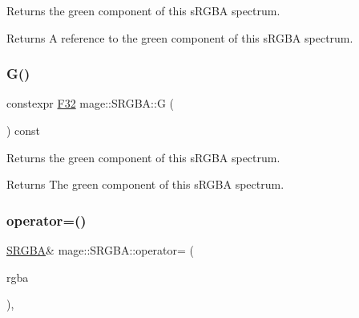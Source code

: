 Returns the green component of this s\+R\+G\+BA spectrum.

\begin{DoxyReturn}{Returns}
A reference to the green component of this s\+R\+G\+BA spectrum. 
\end{DoxyReturn}
\mbox{\label{structmage_1_1_s_r_g_b_a_a1601a73d4e73c2d5dfe0281b050533a6}} 
\subsubsection{\texorpdfstring{G()}{G()}\hspace{0.1cm}{\footnotesize\ttfamily [2/2]}}
{\footnotesize\ttfamily constexpr \mbox{\hyperlink{namespacemage_aa97e833b45f06d60a0a9c4fc22ae02c0}{F32}} mage\+::\+S\+R\+G\+B\+A\+::G (\begin{DoxyParamCaption}{ }\end{DoxyParamCaption}) const\hspace{0.3cm}{\ttfamily [noexcept]}}

Returns the green component of this s\+R\+G\+BA spectrum.

\begin{DoxyReturn}{Returns}
The green component of this s\+R\+G\+BA spectrum. 
\end{DoxyReturn}
\mbox{\label{structmage_1_1_s_r_g_b_a_ac21035a9eadad3c0d78364b17692e4fc}} 
\subsubsection{\texorpdfstring{operator=()}{operator=()}\hspace{0.1cm}{\footnotesize\ttfamily [1/2]}}
{\footnotesize\ttfamily \mbox{\hyperlink{structmage_1_1_s_r_g_b_a}{S\+R\+G\+BA}}\& mage\+::\+S\+R\+G\+B\+A\+::operator= (\begin{DoxyParamCaption}\item[{const \mbox{\hyperlink{structmage_1_1_s_r_g_b_a}{S\+R\+G\+BA}} \&}]{rgba }\end{DoxyParamCaption})\hspace{0.3cm}{\ttfamily [default]}, {\ttfamily [noexcept]}}


